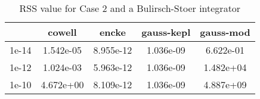 \begin{table}
\centering
\begin{tabular}{|c|c|c|c|c|}
\hline
 & cowell & encke & gauss-kepl & gauss-mod \\
\hline
1e-14 & 1.542e-05 & 8.955e-12 & 1.036e-09 & 6.622e-01 \\
\hline
1e-12 & 1.024e-03 & 5.963e-12 & 1.036e-09 & 1.482e+04 \\
\hline
1e-10 & 4.672e+00 & 8.109e-12 & 1.036e-09 & 4.887e+09 \\
\hline
\end{tabular}
\caption{RSS value for Case 2 and a Bulirsch-Stoer integrator}
\label{table:tab:keplerapprox_rss_C2_Bulirsch-Stoer}
\end{table}
